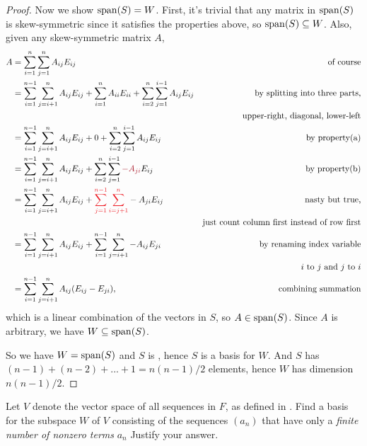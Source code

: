 \begin{proof}
Now we show \(\operatorname{span}(S) = W\).
First, it's trivial that any matrix in \(\operatorname{span}(S)\) is skew-symmetric since it satisfies the properties above, so \(\operatorname{span}(S) \subseteq W\).
Also, given any skew-symmetric matrix \(A\),
\begin{align*}
    A & = \sum_{i = 1}^{n} \sum_{j = 1}^n A_{ij} E_{ij} & \text{of course} \\
      & = \sum_{i = 1}^{n - 1} \sum_{j = i + 1}^n A_{ij} E_{ij} + \sum_{i = 1}^n A_{ii} E_{ii} + \sum_{i = 2}^n \sum_{j = 1}^{i - 1} A_{ij} E_{ij} & \text{by splitting into three parts,} \\
      & & \text{upper-right, diagonal, lower-left} \\
      & = \sum_{i = 1}^{n - 1} \sum_{j = i + 1}^n A_{ij} E_{ij} + 0 + \sum_{i = 2}^n \sum_{j = 1}^{i - 1} A_{ij} E_{ij} & \text{by property(a)} \\
      & = \sum_{i = 1}^{n - 1} \sum_{j = i + 1}^n A_{ij} E_{ij} + \sum_{i = 2}^n \sum_{j = 1}^{i - 1} \MAROON{-A_{ji}} E_{ij} & \text{by property(b)} \\
      & = \sum_{i = 1}^{n - 1} \sum_{j = i + 1}^n A_{ij} E_{ij} + \RED{\sum_{j = 1}^{n - 1} \sum_{i = j + 1}^n} -A_{ji} E_{ij} & \text{nasty but true,} \\
      & & \text{just count column first instead of row first} \\
      & = \sum_{i = 1}^{n - 1} \sum_{j = i + 1}^n A_{ij} E_{ij} + \sum_{i = 1}^{n - 1} \sum_{j = i + 1}^n -A_{ij} E_{ji} & \text{by renaming index variable} \\
      & & \text{\(i\) to \(j\) and \(j\) to \(i\)} \\
      & = \sum_{i = 1}^{n - 1} \sum_{j = i + 1}^n A_{ij} (E_{ij} - E_{ji}), & \text{combining summation}
\end{align*}
which is a linear combination of the vectors in \(S\), so \(A \in \operatorname{span}(S)\).
Since \(A\) is arbitrary, we have \(W \subseteq \operatorname{span}(S)\).

So we have \(W = \operatorname{span}(S)\) and \(S\) is \LID{}, hence \(S\) is a basis for \(W\).
And \(S\) has \((n - 1) + (n - 2) + ... + 1 = n(n - 1)/2\) elements, hence \(W\) has dimension \(n(n - 1)/2\).
\end{proof}

\begin{exercise} \label{exercise 1.6.18}
Let \(V\) denote the vector space of all sequences in \(F\), as defined in .
Find a basis for the subspace \(W\) of \(V\) consisting of the sequences \((a_n)\) that have only a \emph{finite number of nonzero terms} \(a_n\)
Justify your answer.
\end{exercise}

